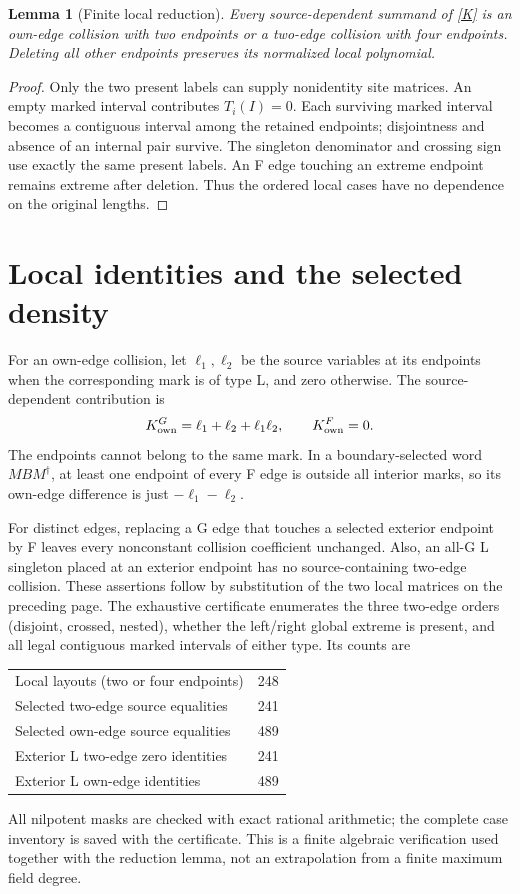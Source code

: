 \documentclass[11pt]{article}
\newtheorem{lemma}{Lemma}
\begin{document}
\begin{lemma}[Finite local reduction]
Every source-dependent summand of \eqref{K} is an own-edge collision
with two endpoints or a two-edge collision with four endpoints.
Deleting all other endpoints preserves its normalized local polynomial.
\end{lemma}
\begin{proof}
Only the two present labels can supply nonidentity site matrices.
An empty marked interval contributes $T_i(I)=0$. Each surviving marked
interval becomes a contiguous interval among the retained endpoints;
disjointness and absence of an internal pair survive. The singleton
denominator and crossing sign use exactly the same present labels.
An F edge touching an extreme endpoint remains extreme after deletion.
Thus the ordered local cases have no dependence on the original lengths.
\end{proof}

\newpage
\section{Local identities and the selected density}
For an own-edge collision, let $\ell_1,\ell_2$ be the source variables
at its endpoints when the corresponding mark is of type L, and zero
otherwise. The source-dependent contribution is
\[
 K_{\rm own}^{G}=\ell_1+\ell_2+\ell_1\ell_2,
 \qquad K_{\rm own}^{F}=0.
\]
The endpoints cannot belong to the same mark. In a boundary-selected
word $M B M^\dagger$, at least one endpoint of every F edge is outside
all interior marks, so its own-edge difference is just
$-\ell_1-\ell_2$.

For distinct edges, replacing a G edge that touches a selected exterior
endpoint by F leaves every nonconstant collision coefficient unchanged.
Also, an all-G L singleton placed at an exterior endpoint has no
source-containing two-edge collision. These assertions follow by
substitution of the two local matrices on the preceding page. The
exhaustive certificate enumerates the three two-edge orders (disjoint,
crossed, nested), whether the left/right global extreme is present, and
all legal contiguous marked intervals of either type. Its counts are
\begin{center}
\begin{tabular}{lr}\toprule
Local layouts (two or four endpoints)&248\\
Selected two-edge source equalities&241\\
Selected own-edge source equalities&489\\
Exterior L two-edge zero identities&241\\
Exterior L own-edge identities&489\\\bottomrule
\end{tabular}
\end{center}
All nilpotent masks are checked with exact rational arithmetic; the
complete case inventory is saved with the certificate. This is a finite
algebraic verification used together with the reduction lemma, not an
extrapolation from a finite maximum field degree.
\end{document}
